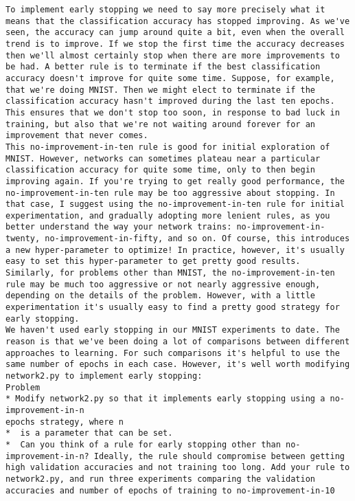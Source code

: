 \begin{lstlisting}
To implement early stopping we need to say more precisely what it means that the classification accuracy has stopped improving. As we've seen, the accuracy can jump around quite a bit, even when the overall trend is to improve. If we stop the first time the accuracy decreases then we'll almost certainly stop when there are more improvements to be had. A better rule is to terminate if the best classification accuracy doesn't improve for quite some time. Suppose, for example, that we're doing MNIST. Then we might elect to terminate if the classification accuracy hasn't improved during the last ten epochs. This ensures that we don't stop too soon, in response to bad luck in training, but also that we're not waiting around forever for an improvement that never comes.
This no-improvement-in-ten rule is good for initial exploration of MNIST. However, networks can sometimes plateau near a particular classification accuracy for quite some time, only to then begin improving again. If you're trying to get really good performance, the no-improvement-in-ten rule may be too aggressive about stopping. In that case, I suggest using the no-improvement-in-ten rule for initial experimentation, and gradually adopting more lenient rules, as you better understand the way your network trains: no-improvement-in-twenty, no-improvement-in-fifty, and so on. Of course, this introduces a new hyper-parameter to optimize! In practice, however, it's usually easy to set this hyper-parameter to get pretty good results. Similarly, for problems other than MNIST, the no-improvement-in-ten rule may be much too aggressive or not nearly aggressive enough, depending on the details of the problem. However, with a little experimentation it's usually easy to find a pretty good strategy for early stopping.
We haven't used early stopping in our MNIST experiments to date. The reason is that we've been doing a lot of comparisons between different approaches to learning. For such comparisons it's helpful to use the same number of epochs in each case. However, it's well worth modifying network2.py to implement early stopping:
Problem
* Modify network2.py so that it implements early stopping using a no-improvement-in-n
epochs strategy, where n
*  is a parameter that can be set.
*  Can you think of a rule for early stopping other than no-improvement-in-n? Ideally, the rule should compromise between getting high validation accuracies and not training too long. Add your rule to network2.py, and run three experiments comparing the validation accuracies and number of epochs of training to no-improvement-in-10

\end{lstlisting}
